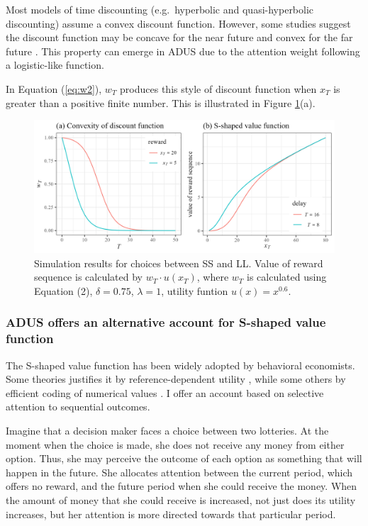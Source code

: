 \documentclass[
  12pt,
]{article}
\begin{document}
Most models of time discounting (e.g.~hyperbolic and quasi-hyperbolic
discounting) assume a convex discount function. However, some studies
suggest the discount function may be concave for the near future and
convex for the far future
\citep{onay_intertemporal_2007, takeuchi_non-parametric_2011, dejarnette_time_2020}.
This property can emerge in ADUS due to the attention weight following a
logistic-like function.

In Equation (\ref{eq:w2}), \(w_T\) produces this style of discount
function when \(x_T\) is greater than a positive finite number. This is
illustrated in Figure \ref{fig:plot-discount-value}(a).

\begin{figure}
  \centering
  \includegraphics{images/plot-discount-value.png}
  \caption{Simulation results for choices between SS and LL. Value of reward sequence is calculated by $w_T\cdot u(x_T)$, where $w_T$ is calculated using Equation (2), $\delta=0.75$, $\lambda=1$, utility funtion $u(x)=x^{0.6}$.}
  \label{fig:plot-discount-value}
\end{figure}

\hypertarget{adus-offers-an-alternative-account-for-s-shaped-value-function}{%
\subsubsection{ADUS offers an alternative account for S-shaped value
function}\label{adus-offers-an-alternative-account-for-s-shaped-value-function}}

The S-shaped value function has been widely adopted by behavioral
economists. Some theories justifies it by reference-dependent utility
\citep{kahneman_prospect_1979, koszegi_model_2006}, while some others by
efficient coding of numerical values \citep{frydman_efficient_2021}. I
offer an account based on selective attention to sequential outcomes.

Imagine that a decision maker faces a choice between two lotteries. At
the moment when the choice is made, she does not receive any money from
either option. Thus, she may perceive the outcome of each option as
something that will happen in the future. She allocates attention
between the current period, which offers no reward, and the future
period when she could receive the money. When the amount of money that
she could receive is increased, not just does its utility increases, but
her attention is more directed towards that particular period.
\end{document}
